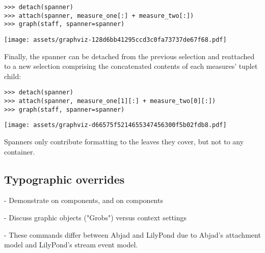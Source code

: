 \begin{abjadbookoutput}
\begin{singlespacing}
\vspace{-0.5\baselineskip}
\begin{lstlisting}
>>> detach(spanner)
>>> attach(spanner, measure_one[:] + measure_two[:])
>>> graph(staff, spanner=spanner)
\end{lstlisting}
\noindent\texttt{[image: assets/graphviz-128d6bb41295ccd3c0fa73737de67f68.pdf]}
\end{singlespacing}
\end{abjadbookoutput}

Finally, the spanner can be detached from the previous selection and reattached
to a new selection comprising the concatenated contents of each measures'
tuplet child:

\begin{comment}
<abjad>
detach(spanner)
attach(spanner, measure_one[1][:] + measure_two[0][:])
graph(staff, spanner=spanner)
</abjad>
\end{comment}

\begin{abjadbookoutput}
\begin{singlespacing}
\vspace{-0.5\baselineskip}
\begin{lstlisting}
>>> detach(spanner)
>>> attach(spanner, measure_one[1][:] + measure_two[0][:])
>>> graph(staff, spanner=spanner)
\end{lstlisting}
\noindent\texttt{[image: assets/graphviz-d66575f5214655347456300f5b02fdb8.pdf]}
\end{singlespacing}
\end{abjadbookoutput}

Spanners only contribute formatting to the leaves they cover, but not to any
container.

\subsection{Typographic overrides}
\label{ssec:typographic-overrides}

-   Demonstrate on components, and on components

-   Discuss graphic objects ("Grobs") versus context settings

-   These commands differ between Abjad and LilyPond due to Abjad's attachment
    model and LilyPond's stream event model.

